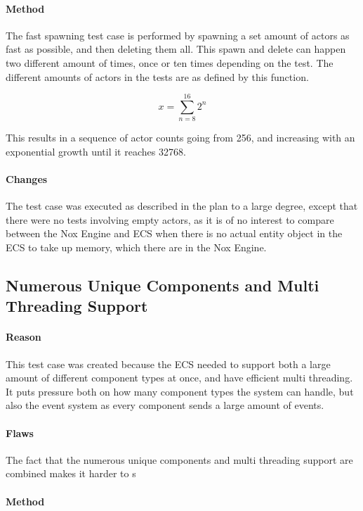 \paragraph{Method}
The fast spawning test case is performed by spawning a set amount of actors as fast as possible, and then deleting them all.
This spawn and delete can happen two different amount of times, once or ten times depending on the test.
The different amounts of actors in the tests are as defined by this function.

\begin{equation}
x = \sum_{n=8}^{16} 2^{n}
\end{equation}

This results in a sequence of actor counts going from 256, and increasing with an exponential growth until it reaches 32768.

\paragraph{Changes}
The test case was executed as described in the plan to a large degree, except that there were no tests involving empty actors, as it is of no interest to compare between the Nox Engine and ECS when there is no actual entity object in the ECS to take up memory, which there are in the Nox Engine.

\subsection{Numerous Unique Components and Multi Threading Support}
\paragraph{Reason}
This test case was created because the ECS needed to support both a large amount of different component types at once, and have efficient multi threading.
It puts pressure both on how many component types the system can handle, but also the event system as every component sends a large amount of events.

\paragraph{Flaws}
The fact that the numerous unique components and multi threading support are combined makes it harder to s

\paragraph{Method}
